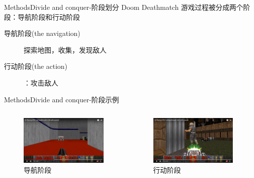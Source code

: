 \documentclass[10pt]{beamer}
\begin{document}
	\begin{frame}{Methods}{Divide and conquer-阶段划分}
		Doom Deathmatch 游戏过程被分成两个阶段：导航阶段和行动阶段
		\begin{description}
			\item[导航阶段(the navigation)]  探索地图，收集，发现敌人
			\item[行动阶段(the action)]：攻击敌人
		\end{description}
		
	
	\end{frame}

	\begin{frame}{Methods}{Divide and conquer-阶段示例}
		\begin{columns}
			\begin{column}{.5\linewidth}
				\begin{figure}
					\centering
					\includegraphics[width=0.9\linewidth]{pictures/deathmatch-2}
					\caption{导航阶段}
					\label{fig:deathmatch-2}
				\end{figure}
			\end{column}
			\begin{column}{.5\linewidth}
				\begin{figure}
					\centering
					\includegraphics[width=0.9\linewidth]{pictures/deathmatch-3}
					\caption{行动阶段}
					\label{fig:deathmatch-3}
				\end{figure}
				
			\end{column}
		\end{columns}
	\end{frame}
\end{document}

